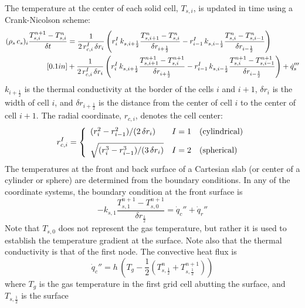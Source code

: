 The temperature at the center of each solid cell, $T_{s,i}$, is updated in time using a Crank-Nicolson scheme:
\begin{align}
\label{crank-nicolson}
(\rho_s \, c_s)_i \frac{T_{s,i}^{n+1}-T_{s,i}^{n}}{\delta t}
& = \frac{1}{2 \, r_{c,i}^I \, \delta r_i} \left( r_{i}^{I} \, k_{s,i+\frac{1}{2}} \frac{T_{s,i+1}^{n}-T_{s,i}^{n}}{\delta
r_{i+\frac{1}{2}}} - r_{i-1}^{I} \, k_{s,i-\frac{1}{2}} \frac{T_{s,i}^{n}-T_{s,i-1}^{n}}{\delta r_{i-\frac{1}{2}}} \right) \notag
\\ [0.1in]
& +\frac{1}{2 \, r_{c,i}^I \, \delta r_i} \left( r_{i}^{I} \, k_{s,i+\frac{1}{2}} \frac{T_{s,i+1}^{n+1}-T_{s,i}^{n+1}}{\delta
r_{i+\frac{1}{2}}} - r_{i-1}^{I} \, k_{s,i-\frac{1}{2}} \frac{T_{s,i}^{n+1}-T_{s,i-1}^{n+1}}{\delta r_{i-\frac{1}{2}}} \right) +
\dot{q}'''_s
\end{align}
$k_{i+\frac{1}{2}}$ is the thermal conductivity at the border of the cells $i$ and $i+1$, $\delta r_i$ is the width of cell $i$,
and  $\delta r_{i+\frac{1}{2}}$ is the distance from the center of cell $i$ to the center of cell $i+1$. The radial coordinate,
$r_{c,i}$, denotes the cell center:
\begin{equation}
r_{c,i}^I = \left\{
\begin{array}{ll} (r_i^2 - r_{i-1}^2)/(2 \, \delta r_i)            & I=1 \quad \hbox{(cylindrical)} \\ [0.1in]
                   \sqrt{ ( r_i^3 - r_{i-1}^3)/(3 \, \delta r_i) } & I=2 \quad \hbox{(spherical)}
\end{array} \right.
\end{equation}
The temperatures at the front and back surface of a Cartesian slab (or center of a cylinder or sphere) are determined from the
boundary conditions. In any of the coordinate systems, the boundary condition at the front surface is
\begin{equation}
\label{bc_front}
 -k_{s,1} \frac{T_{s,1}^{n+1}-T_{s,0}^{n+1}}{\delta r_{\frac{1}{2}}}
  =  \dot{q}_{c}''+\dot{q}_{r}''
\end{equation}
Note that $T_{s,0}$ does not represent the gas temperature, but rather it is used to establish the temperature gradient at the
surface. Note also that the thermal conductivity is that of the first node. The convective heat flux is
\begin{equation}
\label{conv}
  \dot{q}_c'' = h \, \left( T_g - \frac{1}{2} \left( T_{s,\frac{1}{2}}^n+T_{s,\frac{1}{2}}^{n+1} \right) \right)
\end{equation}
where $T_g$ is the gas temperature in the first grid cell abutting the surface, and $T_{s,\frac{1}{2}}$ is the surface
